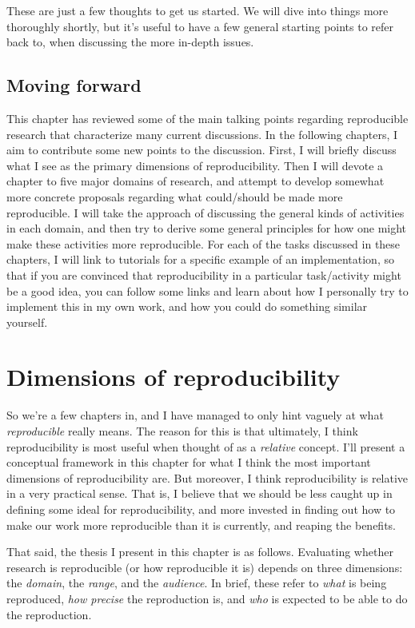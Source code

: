 \documentclass{book}
\begin{document}
These are just a few thoughts to get us started.  We will dive into things more thoroughly shortly, but it's useful to have a few general starting points to refer back to, when discussing the more in-depth issues.
\section{Moving forward}
\label{sec-2-6}

This chapter has reviewed some of the main talking points regarding reproducible research that characterize many current discussions. In the following chapters, I aim to contribute some new points to the discussion. First, I will briefly discuss what I see as the primary dimensions of reproducibility. Then I will devote a chapter to five major domains of research, and attempt to develop somewhat more concrete proposals regarding what could/should be made more reproducible. I will take the approach of discussing the general kinds of activities in each domain, and then try to derive some general principles for how one might make these activities more reproducible.  For each of the tasks discussed in these chapters, I will link to tutorials for a specific example of an implementation, so that if you are convinced that reproducibility in a particular task/activity might be a good idea, you can follow some links and learn about how I personally try to implement this in my own work, and how you could do something similar yourself.
\chapter{Dimensions of reproducibility}
\label{sec-3}
\label{dimensions}

So we're a few chapters in, and I have managed to only hint vaguely at what \emph{reproducible} really means.  The reason for this is that ultimately, I think reproducibility is most useful when thought of as a \emph{relative} concept. I'll present a conceptual framework in this chapter for what I think the most important dimensions of reproducibility are. But moreover, I think reproducibility is relative in a very practical sense. That is, I believe that we should be less caught up in defining some ideal for reproducibility, and more invested in finding out how to make our work more reproducible than it is currently, and reaping the benefits.

That said, the thesis I present in this chapter is as follows. Evaluating whether research is reproducible (or how reproducible it is) depends on three dimensions: the \emph{domain}, the \emph{range}, and the \emph{audience}.  In brief, these refer to \emph{what} is being reproduced, \emph{how precise} the reproduction is, and \emph{who} is expected to be able to do the reproduction. 
\end{document}
